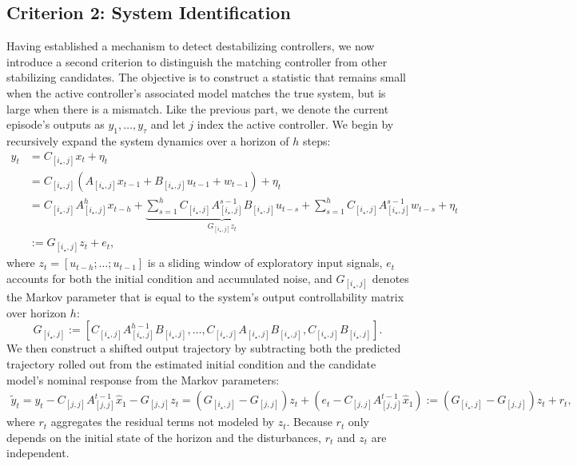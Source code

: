 \documentclass[11pt, twoside]{article}
\theoremstyle{definition}
\begin{document}
\subsection{Criterion 2: System Identification}
\label{sec:sys-id}
Having established a mechanism to detect destabilizing controllers, we now introduce a second criterion to distinguish the matching controller from other stabilizing candidates.
The objective is to construct a statistic that remains small when the active controller's associated model matches the true system, but is large when there is a mismatch.
Like the previous part, we denote the current episode's outputs as $y_1, \dots, y_\tau$ and let $j$ index the active controller.
We begin by recursively expand the system dynamics over a horizon of $h$ steps:
\begin{align*}
    y_t &= C_{[i_\star, j]} x_t + \eta_t \\
    &= C_{[i_\star, j]} (A_{[i_\star, j]} x_{t-1} + B_{[i_\star, j]} u_{t-1} + w_{t-1}) + \eta_t \\
    &= C_{[i_\star, j]} A_{[i_\star, j]}^{h} x_{t-h} \! + \! \underbrace{\sum_{s=1}^h C_{[i_\star, j]} A_{[i_\star, j]}^{s-1} B_{[i_\star, j]} u_{t-s}}_{G_{[i_\star, j]} z_t} \! + \! \sum_{s=1}^h C_{[i_\star, j]} A_{[i_\star, j]}^{s-1} w_{t-s} + \! \eta_t \\
    &:= G_{[i_\star, j]} z_t + e_t,
\end{align*}
where $z_t = [u_{t-h}; \dots; u_{t-1}]$ is a sliding window of exploratory input signals, $e_t$ accounts for both the initial condition and accumulated noise, and $G_{[i_\star, j]}$ denotes the Markov parameter that is equal to the system's output controllability matrix over horizon $h$:
\[G_{[i_\star, j]} := \left[C_{[i_\star, j]} A^{h-1}_{[i_\star, j]} B_{[i_\star, j]}, \dots, C_{[i_\star, j]} A_{[i_\star, j]} B_{[i_\star, j]}, C_{[i_\star, j]} B_{[i_\star, j]}\right].\]
We then construct a shifted output trajectory by subtracting both the predicted trajectory rolled out from the estimated initial condition and the candidate model's nominal response from the Markov parameters:
\begin{align*}
    \widetilde{y}_t 
    = y_t - C_{[j, j]} A_{[j, j]}^{t-1}\hat{x}_1 - G_{[j, j]} z_t
    = (G_{[i_\star, j]} - G_{[j, j]})z_t + (e_t - C_{[j, j]} A_{[j, j]}^{t-1}\hat{x}_1)
    := (G_{[i_\star, j]} - G_{[j, j]}) z_t + r_t,
\end{align*}
where $r_t$ aggregates the residual terms not modeled by $z_t$.
Because $r_t$ only depends on the initial state of the horizon and the disturbances, $r_t$ and $z_t$ are independent.
\end{document}
